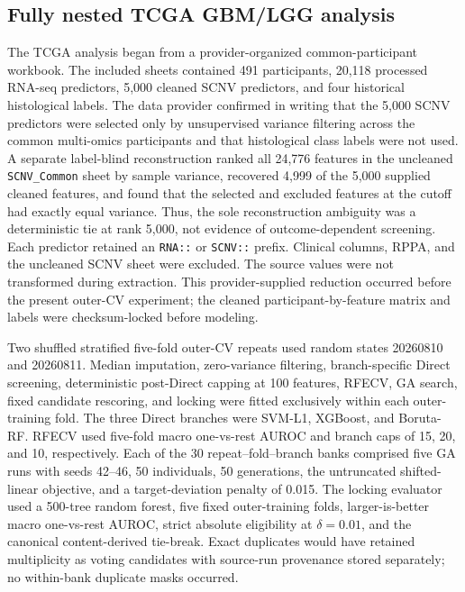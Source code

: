 \subsection{Fully nested TCGA GBM/LGG analysis}

The TCGA analysis began from a provider-organized common-participant workbook.
The included sheets contained 491 participants, 20,118 processed RNA-seq predictors, 5,000 cleaned SCNV predictors, and four historical histological labels. The data provider confirmed in writing that the 5,000 SCNV predictors were selected only by unsupervised variance filtering across the common multi-omics participants and that histological class labels were not used. A separate label-blind reconstruction ranked all 24,776 features in the uncleaned \texttt{SCNV\_Common} sheet by sample variance, recovered 4,999 of the 5,000 supplied cleaned features, and found that the selected and excluded features at the cutoff had exactly equal variance. Thus, the sole reconstruction ambiguity was a deterministic tie at rank 5,000, not evidence of outcome-dependent screening. Each predictor retained an \texttt{RNA::} or \texttt{SCNV::} prefix. Clinical columns, RPPA, and the uncleaned SCNV sheet were excluded. The source values were not transformed during extraction. This provider-supplied reduction occurred before the present outer-CV experiment; the cleaned participant-by-feature matrix and labels were checksum-locked before modeling.

Two shuffled stratified five-fold outer-CV repeats used random states 20260810 and 20260811. Median imputation, zero-variance filtering, branch-specific Direct screening, deterministic post-Direct capping at 100 features, RFECV, GA search, fixed candidate rescoring, and locking were fitted exclusively within each outer-training fold. The three Direct branches were SVM-L1, XGBoost, and Boruta-RF. RFECV used five-fold macro one-vs-rest AUROC and branch caps of 15, 20, and 10, respectively. Each of the 30 repeat--fold--branch banks comprised five GA runs with seeds 42--46, 50 individuals, 50 generations, the untruncated shifted-linear objective, and a target-deviation penalty of 0.015. The locking evaluator used a 500-tree random forest, five fixed outer-training folds, larger-is-better macro one-vs-rest AUROC, strict absolute eligibility at \(\delta=0.01\), and the canonical content-derived tie-break. Exact duplicates would have retained multiplicity as voting candidates with source-run provenance stored separately; no within-bank duplicate masks occurred.

